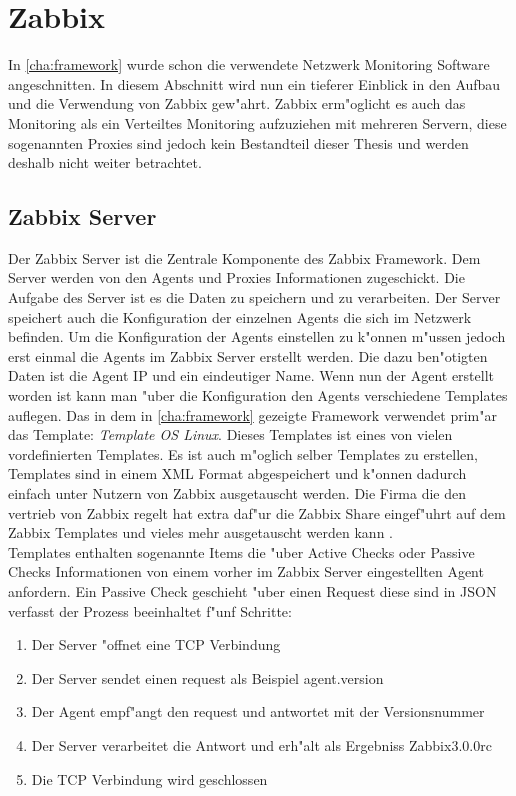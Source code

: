 \chapter{Zabbix}
\label{cha:zabbix}
In \cref{cha:framework} wurde schon die verwendete Netzwerk Monitoring Software angeschnitten. In diesem Abschnitt wird nun %
ein tieferer Einblick in den Aufbau und die Verwendung von Zabbix gew"ahrt. Zabbix erm"oglicht es %
auch das Monitoring als ein Verteiltes Monitoring aufzuziehen mit mehreren Servern, diese sogenannten Proxies %
sind jedoch kein Bestandteil dieser Thesis und werden deshalb nicht weiter betrachtet.

\section{Zabbix Server}
Der Zabbix Server ist die Zentrale Komponente des Zabbix Framework. Dem Server werden von den Agents und Proxies %
Informationen zugeschickt. Die Aufgabe des Server ist es die Daten zu speichern und zu verarbeiten. %
Der Server speichert auch die Konfiguration der einzelnen Agents die sich im Netzwerk befinden. %
Um die Konfiguration der Agents einstellen zu k"onnen m"ussen jedoch erst einmal die Agents im Zabbix %
Server erstellt werden. Die dazu ben"otigten Daten ist die Agent IP und ein eindeutiger Name. %
Wenn nun der Agent erstellt worden ist kann man "uber die Konfiguration den Agents verschiedene Templates auflegen. %
Das in dem in \cref{cha:framework} gezeigte Framework verwendet prim"ar das Template: \emph{Template OS %
Linux}. Dieses Templates ist eines von vielen vordefinierten Templates. Es ist auch m"oglich selber Templates %
zu erstellen, Templates sind in einem XML Format abgespeichert und k"onnen dadurch einfach unter Nutzern von Zabbix %
ausgetauscht werden. Die Firma die den vertrieb von Zabbix regelt hat extra daf"ur die Zabbix Share eingef"uhrt %
auf dem Zabbix Templates und vieles mehr ausgetauscht werden kann \autocite{zabbix:share}. \ \\ %
Templates enthalten sogenannte Items die "uber Active Checks oder Passive Checks Informationen von %
einem vorher im Zabbix Server eingestellten Agent anfordern. Ein Passive Check geschieht "uber einen %
Request diese sind in JSON verfasst der Prozess beeinhaltet f"unf Schritte: %
\begin{enumerate}
\item Der Server "offnet eine TCP Verbindung %
\item Der Server sendet einen request als Beispiel agent.version %
\item Der Agent empf"angt den request und antwortet mit der Versionsnummer %
\item Der Server verarbeitet die Antwort und erh"alt als Ergebniss Zabbix3.0.0rc %
\item Die TCP Verbindung wird geschlossen %
\end{enumerate}
